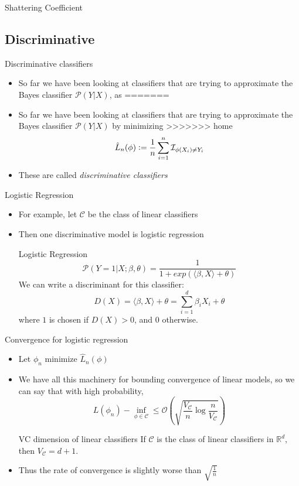 \documentclass{beamer}
\renewcommand{\Pr}[1]{\mathcal{P} \left( #1 \right)}
\newcommand{\cls}{\mathcal{C}}
\newcommand{\R}{\mathbb{R}}
\newcommand{\defeq}{\vcentcolon=}
\newcommand{\pa}[1]{\left( #1 \right)}
\newcommand{\I}{\mathcal{I}}
\newcommand{\an}[1]{\langle #1 \rangle}
\begin{document}
\begin{frame}{Shattering Coefficient}
\subsection{Discriminative}
\begin{frame}{Discriminative classifiers}
\begin{itemize}
<<<<<<< HEAD
\item So far we have been looking at classifiers that are trying to approximate the Bayes classifier $\Pr{Y|X}$, as
=======
\item So far we have been looking at classifiers that are trying to approximate the Bayes classifier $\Pr{Y|X}$ by minimizing
>>>>>>> home
\[ \hat{L}_n(\phi) \defeq \frac1n \sum_{i=1}^n \I_{\phi(X_i) \ne Y_i} \]
\item These are called \emph{discriminative classifiers}
\end{itemize}
\end{frame}

\begin{frame}{Logistic Regression}
\begin{itemize}
\item For example, let $\cls$ be the class of linear classifiers
\item Then one discriminative model is logistic regression
\begin{block}{Logistic Regression}
\[ \Pr{Y=1|X;\beta,\theta} = \frac1{1+exp(\an{\beta,X} + \theta)} \]
We can write a discriminant for this classifier:
\[ D(X) = \an{\beta,X} + \theta = \sum_{i=1}^d \beta_i X_i + \theta \]
where $1$ is chosen if $D(X) > 0$, and 0 otherwise.
\end{block}
\end{itemize}
\end{frame}

\begin{frame}{Convergence for logistic regression}
\begin{itemize}
\item Let $\phi_n$ minimize $\hat{L}_n(\phi)$
\item We have all this machinery for bounding convergence of linear models, so we can say that with high probability,
\[ L(\phi_n) - \inf_{\phi \in \cls} \leq \mathcal O \pa{ \sqrt{\frac{V_\cls}{n} \log\frac{n}{V_\cls}}} \]
\begin{block}{VC dimension of linear classifiers}
If $\cls$ is the class of linear classifiers in $\R^d$, then $V_\cls = d+1$.
\end{block}
\item Thus the rate of convergence is slightly worse than $\sqrt{\frac1n}$
\end{itemize}
\end{frame}


\end{frame}
\end{document}
